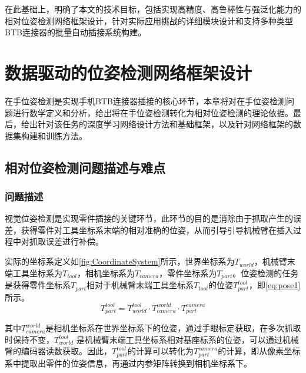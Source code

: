 \documentclass{Diploma}
\begin{document}
在此基础上，明确了本文的技术目标，包括实现高精度、高鲁棒性与强泛化能力的相对位姿检测网络框架设计，针对实际应用挑战的详细模块设计和支持多种类型BTB连接器的批量自动插接系统构建。

\chapter[framework]{数据驱动的位姿检测网络框架设计}
在手位姿检测是实现手机BTB连接器插接的核心环节，本章将对在手位姿检测问题进行数学定义和分析，给出将在手位姿检测转化为相对位姿检测的理论依据。最后，给出针对该任务的深度学习网络设计方法和基础框架，以及针对网络框架的数据集构建和训练方法。

\section{相对位姿检测问题描述与难点}

\subsection{问题描述}
视觉位姿检测是实现零件插接的关键环节，此环节的目的是消除由于抓取产生的误差，获得零件对工具坐标系末端的相对准确的位姿，从而引导引导机械臂在插入过程中对抓取误差进行补偿。

%

实际的坐标系定义如\ref{fig:CoordinateSystem}所示，世界坐标系为$T_{world}$，机械臂末端工具坐标系为$T_{tool}$，相机坐标系为$T_{camera}$，零件坐标系为$T_{part}$。位姿检测的任务是获得零件坐标系$T_{part}$相对于机械臂末端工具坐标系$T_{tool}$的位姿$T_{part}^{tool}$，即\eqref{eq:pose1}所示。
\begin{equation}
  T_{part}^{tool} =T_{world}^{tool} \cdot T_{camera}^{world} \cdot T_{part}^{camera} \label{eq:pose1}
\end{equation}

其中$T_{camera}^{world}$是相机坐标系在世界坐标系下的位姿，通过手眼标定获取，在多次抓取时保持不变，$T_{world}^{tool}$ 是机械臂末端工具坐标系相对基座标系的位姿，可以通过机械臂的编码器读数获取。因此，$T_{part}^{tool}$的计算可以转化为$T_{part}^{camera}$的计算，即从像素坐标系中提取出零件的位姿信息，再通过内参矩阵转换到相机坐标系下。

%
\end{document}
